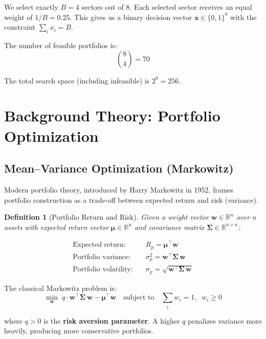 \documentclass[12pt, a4paper]{article}
\newtheorem{definition}{Definition}[section]
\begin{document}
We select exactly $B = 4$ sectors out of 8. Each selected sector receives an
equal weight of $1/B = 0.25$. This gives us a binary decision vector
$\mathbf{x} \in \{0,1\}^8$ with the constraint $\sum_i x_i = B$.

The number of feasible portfolios is:
\[
\binom{8}{4} = 70
\]

The total search space (including infeasible) is $2^8 = 256$.


\section{Background Theory: Portfolio Optimization}

\subsection{Mean--Variance Optimization (Markowitz)}

Modern portfolio theory, introduced by Harry Markowitz in 1952, frames
portfolio construction as a trade-off between expected return and risk
(variance).

\begin{definition}[Portfolio Return and Risk]
Given a weight vector $\mathbf{w} \in \mathbb{R}^n$ over $n$ assets with
expected return vector $\bm{\mu} \in \mathbb{R}^n$ and covariance matrix
$\bm{\Sigma} \in \mathbb{R}^{n \times n}$:

\begin{align}
\text{Expected return:} \quad & R_p = \bm{\mu}^\top \mathbf{w} \\[4pt]
\text{Portfolio variance:} \quad & \sigma_p^2 = \mathbf{w}^\top \bm{\Sigma}\, \mathbf{w} \\[4pt]
\text{Portfolio volatility:} \quad & \sigma_p = \sqrt{\mathbf{w}^\top \bm{\Sigma}\, \mathbf{w}}
\end{align}
\end{definition}

The classical Markowitz problem is:
\[
\min_{\mathbf{w}} \; q \cdot \mathbf{w}^\top \bm{\Sigma}\, \mathbf{w}
    - \bm{\mu}^\top \mathbf{w}
\quad \text{subject to} \quad
\sum_i w_i = 1, \;\; w_i \geq 0
\]

where $q > 0$ is the \textbf{risk aversion parameter}. A higher $q$ penalizes
variance more heavily, producing more conservative portfolios.
\end{document}
